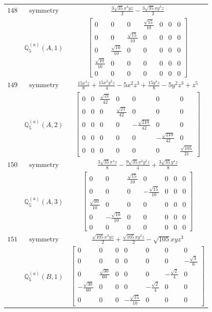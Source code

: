 \documentclass[fleqn,8pt,landscape]{jsarticle}
\begin{document}
\begin{longtable}{ccc}
$ 148 $ & $ \text{symmetry} $ & $ \frac{3 \sqrt{35} x^{3} y z}{2} - \frac{3 \sqrt{35} x y^{3} z}{2} $ \\
$  $ & $ \mathbb{Q}_{5}^{(a)}(A,1) $ & $ \begin{bmatrix} 0 & 0 & 0 & \frac{\sqrt{15}}{10} & 0 & 0 & 0 \\ 0 & 0 & \frac{\sqrt{15}}{10} & 0 & 0 & 0 & 0 \\ 0 & \frac{\sqrt{10}}{10} & 0 & 0 & 0 & 0 & 0 \\ \frac{\sqrt{10}}{10} & 0 & 0 & 0 & 0 & 0 & 0 \\ 0 & 0 & 0 & 0 & 0 & 0 & 0 \end{bmatrix} $ \\ \hline
$ 149 $ & $ \text{symmetry} $ & $ \frac{15 x^{4} z}{8} + \frac{15 x^{2} y^{2} z}{4} - 5 x^{2} z^{3} + \frac{15 y^{4} z}{8} - 5 y^{2} z^{3} + z^{5} $ \\
$  $ & $ \mathbb{Q}_{5}^{(a)}(A,2) $ & $ \begin{bmatrix} 0 & 0 & \frac{\sqrt{21}}{42} & 0 & 0 & 0 & 0 \\ 0 & 0 & 0 & \frac{\sqrt{21}}{42} & 0 & 0 & 0 \\ 0 & 0 & 0 & 0 & - \frac{\sqrt{210}}{42} & 0 & 0 \\ 0 & 0 & 0 & 0 & 0 & - \frac{\sqrt{210}}{42} & 0 \\ 0 & 0 & 0 & 0 & 0 & 0 & \frac{\sqrt{105}}{21} \end{bmatrix} $ \\ \hline
$ 150 $ & $ \text{symmetry} $ & $ \frac{3 \sqrt{35} x^{4} z}{8} - \frac{9 \sqrt{35} x^{2} y^{2} z}{4} + \frac{3 \sqrt{35} y^{4} z}{8} $ \\
$  $ & $ \mathbb{Q}_{5}^{(a)}(A,3) $ & $ \begin{bmatrix} 0 & 0 & \frac{\sqrt{15}}{10} & 0 & 0 & 0 & 0 \\ 0 & 0 & 0 & - \frac{\sqrt{15}}{10} & 0 & 0 & 0 \\ \frac{\sqrt{10}}{10} & 0 & 0 & 0 & 0 & 0 & 0 \\ 0 & - \frac{\sqrt{10}}{10} & 0 & 0 & 0 & 0 & 0 \\ 0 & 0 & 0 & 0 & 0 & 0 & 0 \end{bmatrix} $ \\ \hline
$ 151 $ & $ \text{symmetry} $ & $ \frac{\sqrt{105} x^{3} y z}{2} + \frac{\sqrt{105} x y^{3} z}{2} - \sqrt{105} x y z^{3} $ \\
$  $ & $ \mathbb{Q}_{5}^{(a)}(B,1) $ & $ \begin{bmatrix} 0 & 0 & 0 & 0 & 0 & 0 & 0 \\ 0 & 0 & 0 & 0 & 0 & 0 & - \frac{\sqrt{3}}{6} \\ 0 & \frac{\sqrt{30}}{60} & 0 & 0 & 0 & - \frac{\sqrt{2}}{4} & 0 \\ - \frac{\sqrt{30}}{60} & 0 & 0 & 0 & - \frac{\sqrt{2}}{4} & 0 & 0 \\ 0 & 0 & 0 & - \frac{\sqrt{15}}{10} & 0 & 0 & 0 \end{bmatrix} $ \\ \hline

\end{longtable}
\end{document}
